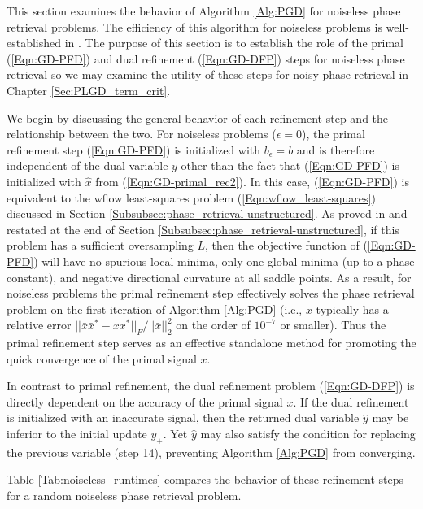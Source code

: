 This section examines the behavior of Algorithm \ref{Alg:PGD} for noiseless phase retrieval problems.  The efficiency of this algorithm for noiseless problems is well-established in \cite[Sections 5.1.1, 5.1.3]{DBLP:journals/siamsc/FriedlanderM16}.  The purpose of this section is to establish the role of the primal (\ref{Eqn:GD-PFD}) and dual refinement (\ref{Eqn:GD-DFP}) steps for noiseless phase retrieval so we may examine the utility of these steps for noisy phase retrieval in Chapter \ref{Sec:PLGD_term_crit}.

We begin by discussing the general behavior of each refinement step and the relationship between the two.  For noiseless problems ($\epsilon = 0$), the primal refinement step (\ref{Eqn:GD-PFD}) is initialized with $b_\epsilon = b$ and is therefore independent of the dual variable $y$ other than the fact that (\ref{Eqn:GD-PFD}) is initialized with $\hat{x}$ from (\ref{Eqn:GD-primal_rec2}).  In this case, (\ref{Eqn:GD-PFD}) is equivalent to the wflow least-squares problem (\ref{Eqn:wflow_least-squares}) discussed in Section \ref{Subsubsec:phase_retrieval-unstructured}.  As proved in \cite{sun2016geometric} and restated at the end of Section \ref{Subsubsec:phase_retrieval-unstructured}, if this problem has a sufficient oversampling $L$, then the objective function of (\ref{Eqn:GD-PFD}) will have no spurious local minima, only one global minima (up to a phase constant), and negative directional curvature at all saddle points.  As a result, for noiseless problems the primal refinement step effectively solves the phase retrieval problem on the first iteration of Algorithm \ref{Alg:PGD} (i.e., $x$ typically has a relative error $|| \bar{x}\bar{x}^* - xx^* ||_F / ||\bar{x}||_2^2$ on the order of $10^{-7}$ or smaller).  Thus the primal refinement step serves as an effective standalone method for promoting the quick convergence of the primal signal $x$.

In contrast to primal refinement, the dual refinement problem (\ref{Eqn:GD-DFP}) is directly dependent on the accuracy of the primal signal $x$.  If the dual refinement is initialized with an inaccurate signal, then the returned dual variable $\hat{y}$ may be inferior to the initial update $y_+$.  Yet $\hat{y}$ may also satisfy the condition for replacing the previous variable (step 14), preventing Algorithm \ref{Alg:PGD} from converging.

Table \ref{Tab:noiseless_runtimes} compares the behavior of these refinement steps for a random noiseless phase retrieval problem.

